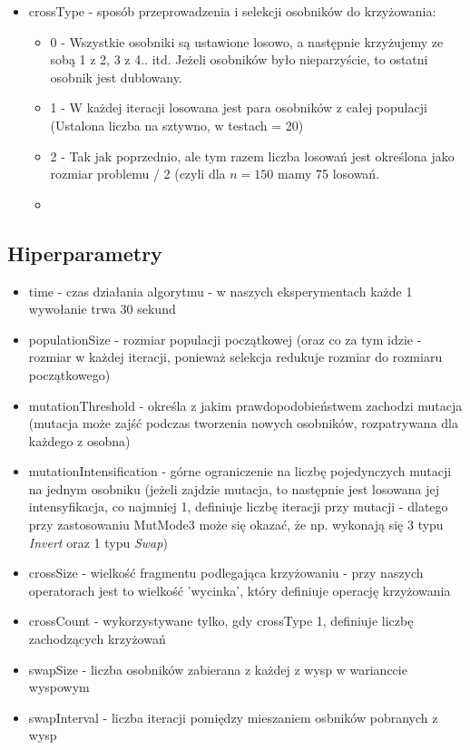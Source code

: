 \documentclass{article}
\begin{document}
\begin{itemize}
	\item crossType - sposób przeprowadzenia i selekcji osobników do krzyżowania:
		\begin{itemize}
			\item 0 - Wszystkie osobniki są ustawione losowo, a następnie krzyżujemy ze sobą 1 z 2, 3 z 4.. itd. Jeżeli osobników było nieparzyście, to ostatni osobnik jest dublowany.
			\item 1 - W każdej iteracji losowana jest para osobników z całej populacji (Ustalona liczba na sztywno, w testach = 20)
			\item 2 - Tak jak poprzednio, ale tym razem liczba losowań jest określona jako rozmiar problemu / 2 (czyli dla $n = 150$ mamy 75 losowań.
	\item 
		\end{itemize}
\end{itemize}

\subsection{Hiperparametry}
\begin{itemize}
	\item time - czas działania algorytmu - w naszych eksperymentach każde 1 wywołanie trwa 30 sekund
	\item populationSize - rozmiar populacji początkowej (oraz co za tym idzie - rozmiar w każdej iteracji, ponieważ selekcja redukuje rozmiar do rozmiaru początkowego)
	\item mutationThreshold - określa z jakim prawdopodobieństwem zachodzi mutacja (mutacja może zajść podczas tworzenia nowych osobników, rozpatrywana dla każdego z osobna)
	\item mutationIntensification - górne ograniczenie na liczbę pojedynczych mutacji na jednym osobniku (jeżeli zajdzie mutacja, to następnie jest losowana jej intensyfikacja, co najmniej 1, definiuje liczbę iteracji przy mutacji - dlatego przy zastosowaniu MutMode3 może się okazać, że np. wykonają się 3 typu \textit{Invert} oraz 1 typu \textit{Swap})
	\item crossSize - wielkość fragmentu podlegająca krzyżowaniu - przy naszych operatorach jest to wielkość 'wycinka', który definiuje operację krzyżowania
	\item crossCount - wykorzystywane tylko, gdy crossType 1, definiuje liczbę zachodzących krzyżowań
	\item swapSize - liczba osobników zabierana z każdej z wysp w warianccie wyspowym
	\item swapInterval - liczba iteracji pomiędzy mieszaniem osbników pobranych z wysp
\end{itemize}
\end{document}
